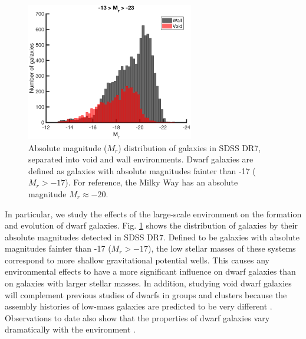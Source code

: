 \begin{figure}
    \includegraphics[width=0.65\textwidth]{Images/Intro/1sig_13-23_SDSS_Mr_hist_count_fill}
    \caption[Absolute magnitude distribution of galaxies in SDSS DR7]{Absolute 
    magnitude ($M_r$) distribution of galaxies in SDSS DR7, separated into void 
    and wall environments.  Dwarf galaxies are defined as galaxies with absolute 
    magnitudes fainter than -17 ($M_r > -17$).  For reference, the Milky Way has 
    an absolute magnitude $M_r \approx -20$.}
    \label{fig:Mr_SDSS}
\end{figure}

In particular, we study the effects of the large-scale environment on the 
formation and evolution of dwarf galaxies.  Fig. \ref{fig:Mr_SDSS} shows the 
distribution of galaxies by their absolute magnitudes detected in SDSS DR7.  
Defined to be galaxies with absolute magnitudes fainter than -17 ($M_r > -17$), 
the low stellar masses of these systems correspond to more shallow gravitational 
potential wells.  This causes any environmental effects to have a more 
significant influence on dwarf galaxies than on galaxies with larger stellar 
masses.  In addition, studying void dwarf galaxies will complement previous 
studies of dwarfs in groups and clusters because the assembly histories of 
low-mass galaxies are predicted to be very different \citep[e.g.,][]{Gao07,
Lackner12}.  Observations to date also show that the properties of dwarf 
galaxies vary dramatically with the environment \citep[e.g.,][]{Ann08,Geha12}.




